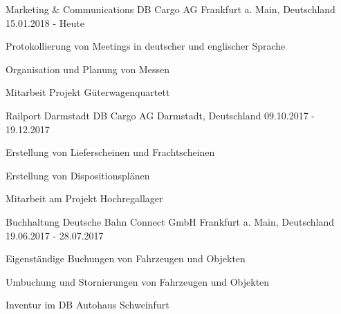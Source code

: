 

\begin{cventries}

  \cventry
    {Marketing \& Communications} %
    {DB Cargo AG} %
    {Frankfurt a. Main, Deutschland} %
    {15.01.2018 - Heute} %
    {
      \begin{cvitems} %
        \item {Protokollierung von Meetings in deutscher und englischer Sprache}
        \item {Organisation und Planung von Messen}
        \item{Mitarbeit Projekt {\glqq}Güterwagenquartett{\grqq}}
      \end{cvitems}
    }
    
  \cventry
    {Railport Darmstadt} %
    {DB Cargo AG} %
    {Darmstadt, Deutschland} %
    {09.10.2017 - 19.12.2017} %
    {
      \begin{cvitems} %
        \item {Erstellung von Lieferscheinen und Frachtscheinen}
        \item {Erstellung von Dispositionsplänen}
        \item {Mitarbeit am Projekt {\glqq}Hochregallager{\grqq}}
      \end{cvitems}
    }
    
  \cventry
    {Buchhaltung} %
    {Deutsche Bahn Connect GmbH} %
    {Frankfurt a. Main, Deutschland} %
    {19.06.2017 - 28.07.2017} %
    {
      \begin{cvitems} %
        \item {Eigenständige Buchungen von Fahrzeugen und Objekten}
        \item {Umbuchung und Stornierungen von Fahrzeugen und Objekten}
        \item {Inventur im DB Autohaus Schweinfurt}
      \end{cvitems}
    }


\end{cventries}
